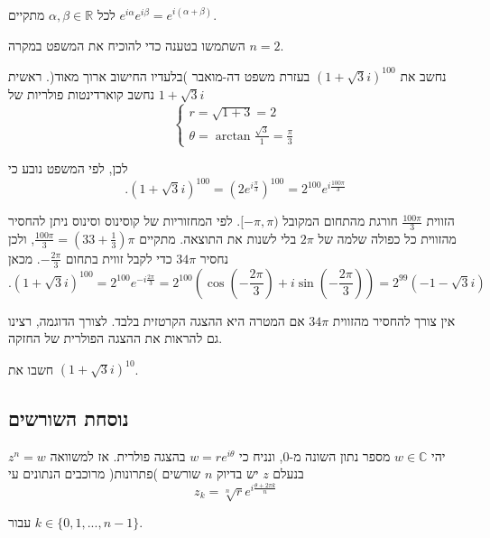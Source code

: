 \documentclass[
  hebrew,
  12pt,
  a4paper,
  oneside]{book}
\theoremstyle{definition}
\theoremstyle{remark}
\theoremstyle{plain}
\theoremstyle{remark}
\begin{document}
\begin{proposition}

לכל \(\alpha,\beta\in\mathbb{R}\) מתקיים
\(e^{i\alpha}e^{i\beta}=e^{i(\alpha+\beta)}\).

\end{proposition}

\begin{exercise}

השתמשו בטענה כדי להוכיח את המשפט במקרה \(n=2\).

\end{exercise}

\begin{example}

נחשב את \((1+\sqrt{3}i)^{100}\) בעזרת משפט דה-מואבר )בלעדיו החישוב ארוך
מאוד(. ראשית נחשב קוארדינטות פולריות של \(1+\sqrt{3}i\) \[\begin{cases}
r=\sqrt{1+3}=2\\
\theta=\arctan\frac{\sqrt{3}}{1}=\frac{\pi}{3}
\end{cases}\]

לכן, לפי המשפט נובע כי
\[.(1+\sqrt{3}i)^{100}=(2e^{i\frac{\pi}{3}})^{100}=2^{100}e^{i\frac{100\pi}{3}}\]

הזווית \(\frac{100\pi}{3}\) חורגת מהתחום המקובל \([-\pi,\pi)\). לפי
המחזוריות של קוסינוס וסינוס ניתן להחסיר מהזווית כל כפולה שלמה של
\(2\pi\) בלי לשנות את התוצאה. מתקיים
\(\frac{100\pi}{3}=(33+\frac{1}{3})\pi\), ולכן נחסיר \(34\pi\) כדי לקבל
זווית בתחום \(-\frac{2\pi}{3}\). מכאן
\[.(1+\sqrt{3}i)^{100}=2^{100}e^{-i\frac{2\pi}{3}}=2^{100}(\cos(-\frac{2\pi}{3})+i\sin(-\frac{2\pi}{3}))=2^{99}(-1-\sqrt{3}i)\]

אין צורך להחסיר מהזווית \(34\pi\) אם המטרה היא ההצגה הקרטזית בלבד. לצורך
הדוגמה, רצינו גם להראות את ההצגה הפולרית של החזקה.

\end{example}

\begin{exercise}

חשבו את \((1+\sqrt{3}i)^{10}\).

\end{exercise}

\subsection{נוסחת
השורשים}\label{ux5e0ux5d5ux5e1ux5d7ux5ea-ux5d4ux5e9ux5d5ux5e8ux5e9ux5d9ux5dd}

\begin{theorem}

יהי \(w\in\mathbb{C}\) מספר נתון השונה מ-\(0\), ונניח כי
\(w=re^{i\theta}\) בהצגה פולרית. אז למשוואה \(z^{n}=w\) בנעלם \(z\) יש
בדיוק \(n\) שורשים )פתרונות( מרוכבים הנתונים עי
\[z_{k}=\sqrt[n]{r}e^{i\frac{\theta+2\pi k}{n}}\]

עבור \(k\in\{0,1,...,n-1\}\).

\end{theorem}
\end{document}
